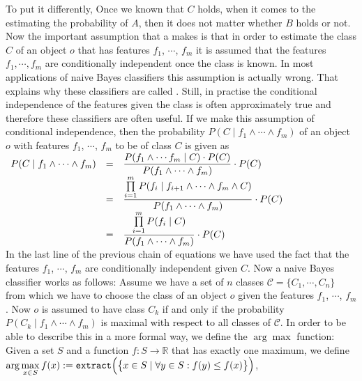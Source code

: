 To put it differently, Once we known that $C$ holds, when it comes to the estimating the probability of $A$,
then it does not matter whether $B$ holds or not.  Now the important assumption that a  
makes is that in order to estimate the class $C$ of an object $o$ that has features $f_1$, $\cdots$, $f_m$ it
is assumed that the features $f_1, \cdots, f_m$ are conditionally independent once the class is known.  In
most applications of naive Bayes classifiers this assumption is actually wrong.  That explains why these
classifiers are called .  Still, in practise the conditional independence of the features given
the class is often approximately true and therefore these classifiers are often useful.  If we make this
assumption of conditional independence, then the probability $P(C\;|\; f_1 \wedge \cdots \wedge f_m)$ of an
object $o$ with features $f_1$, $\cdots$, $f_m$ to be of class $C$ is given as
\\[0.2cm]
\hspace*{1.3cm}
$
\begin{array}[t]{lcll}
      P(C\;|\; f_1 \wedge \cdots \wedge f_m) 
& = & \displaystyle \frac{P(f_1 \wedge \cdots f_m \;|\; C) \cdot P(C)}{P(f_1 \wedge \cdots \wedge f_m)} \cdot P(C) \\[0.2cm]
& = & \displaystyle \frac{\prod\limits_{i=1}^m P(f_i \;|\; f_{i+1} \wedge \cdots \wedge f_m \wedge C)}{P(f_1 \wedge \cdots \wedge f_m)} \cdot P(C) \\[0.2cm]
& = & \displaystyle \frac{\prod\limits_{i=1}^m P(f_i \;|\; C)}{P(f_1 \wedge \cdots \wedge f_m)} \cdot P(C) 
\end{array}
$
\\[0.2cm]
In the last line of the previous chain of equations we have used the fact that the features $f_1$, $\cdots$,
$f_m$ are conditionally independent given $C$.  Now a naive Bayes classifier works as follows: 
Assume we have a set of $n$ classes $\mathcal{C} = \{ C_1, \cdots, C_n \}$ from which we have to choose the
class of an object $o$ given the features  $f_1$, $\cdots$, $f_m$.  Now $o$ is assumed to have class $C_k$ if
and only if the probability $P(C_k\;|\; f_1 \wedge \cdots \wedge f_m)$ is maximal with respect to all classes
of $\mathcal{C}$.  In order to be able to describe this in a more formal
way, we define the $\arg\max$ function: Given a set $S$ and a function $f:S \rightarrow \mathbb{R}$ that has
exactly one maximum, we define
\\[0.2cm]
\hspace*{1.3cm}
$\arg\max\limits_{x \in S} f(x) := \texttt{extract}\Bigl(\bigl\{ x \in S \mid \forall y \in S: f(y) \leq f(x)\bigr\}\Bigr)$,
